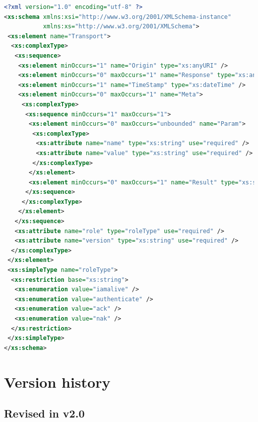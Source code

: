 \documentclass[a4paper,11pt]{ivoa}
\begin{document}
\begin{lstlisting}[language=XML]
<?xml version="1.0" encoding="utf-8" ?>
<xs:schema xmlns:xsi="http://www.w3.org/2001/XMLSchema-instance"
           xmlns:xs="http://www.w3.org/2001/XMLSchema">
 <xs:element name="Transport">
  <xs:complexType>
   <xs:sequence>
    <xs:element minOccurs="1" name="Origin" type="xs:anyURI" />
    <xs:element minOccurs="0" maxOccurs="1" name="Response" type="xs:anyURI" />
    <xs:element minOccurs="1" name="TimeStamp" type="xs:dateTime" />
    <xs:element minOccurs="0" maxOccurs="1" name="Meta">
     <xs:complexType>
      <xs:sequence minOccurs="1" maxOccurs="1">
       <xs:element minOccurs="0" maxOccurs="unbounded" name="Param">
        <xs:complexType>
         <xs:attribute name="name" type="xs:string" use="required" />
         <xs:attribute name="value" type="xs:string" use="required" />
        </xs:complexType>
       </xs:element>
       <xs:element minOccurs="0" maxOccurs="1" name="Result" type="xs:string" />
      </xs:sequence>
     </xs:complexType>
    </xs:element>
   </xs:sequence>
   <xs:attribute name="role" type="roleType" use="required" />
   <xs:attribute name="version" type="xs:string" use="required" />
  </xs:complexType>
 </xs:element>
 <xs:simpleType name="roleType">
  <xs:restriction base="xs:string">
   <xs:enumeration value="iamalive" />
   <xs:enumeration value="authenticate" />
   <xs:enumeration value="ack" />
   <xs:enumeration value="nak" />
  </xs:restriction>
 </xs:simpleType>
</xs:schema>
\end{lstlisting}

\section{Version history}

\subsection{Revised in v2.0}
\end{document}
